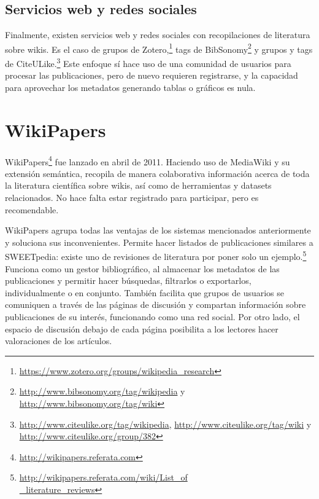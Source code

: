 \documentclass[11pt,twocolumn]{article}
\begin{document}
\subsection{Servicios web y redes sociales}
Finalmente, existen servicios web y redes sociales con recopilaciones de literatura sobre wikis. Es el caso de grupos de Zotero,\footnote{\href{https://www.zotero.org/groups/wikipedia_research}{https://www.zotero.org/groups/wikipedia\_research}} tags de BibSonomy\footnote{\href{http://www.bibsonomy.org/tag/wikipedia}{http://www.bibsonomy.org/tag/wikipedia} y \href{http://www.bibsonomy.org/tag/wiki}{http://www.bibsonomy.org/tag/wiki}} y grupos y tags de CiteULike.\footnote{\href{http://www.citeulike.org/tag/wikipedia}{http://www.citeulike.org/tag/wikipedia}, \href{http://www.citeulike.org/tag/wiki}{http://www.citeulike.org/tag/wiki} y \href{http://www.citeulike.org/group/382}{http://www.citeulike.org/group/382}} Este enfoque sí hace uso de una comunidad de usuarios para procesar las publicaciones, pero de nuevo requieren registrarse, y la capacidad para aprovechar los metadatos generando tablas o gráficos es nula.

\section{WikiPapers}
WikiPapers\footnote{\href{http://wikipapers.referata.com}{http://wikipapers.referata.com}} fue lanzado en abril de 2011. Haciendo uso de MediaWiki y su extensión semántica, recopila de manera colaborativa información acerca de toda la literatura científica sobre wikis, así como de herramientas y datasets relacionados. No hace falta estar registrado para participar, pero es recomendable.

WikiPapers agrupa todas las ventajas de los sistemas mencionados anteriormente y soluciona sus inconvenientes. Permite hacer listados de publicaciones similares a SWEETpedia: existe uno de revisiones de literatura por poner solo un ejemplo.\footnote{\href{http://wikipapers.referata.com/wiki/List_of_literature_reviews}{http://wikipapers.referata.com/wiki/List\_of\\ \_literature\_reviews}} Funciona como un gestor bibliográfico, al almacenar los metadatos de las publicaciones y permitir hacer búsquedas, filtrarlos o exportarlos, individualmente o en conjunto. También facilita que grupos de usuarios se comuniquen a través de las páginas de discusión y compartan información sobre publicaciones de su interés, funcionando como una red social. Por otro lado, el espacio de discusión debajo de cada página posibilita a los lectores hacer valoraciones de los artículos.
\end{document}
